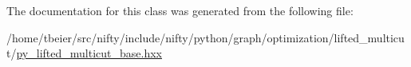 The documentation for this class was generated from the following file\+:\begin{DoxyCompactItemize}
\item 
/home/tbeier/src/nifty/include/nifty/python/graph/optimization/lifted\+\_\+multicut/\hyperlink{py__lifted__multicut__base_8hxx}{py\+\_\+lifted\+\_\+multicut\+\_\+base.\+hxx}\end{DoxyCompactItemize}
